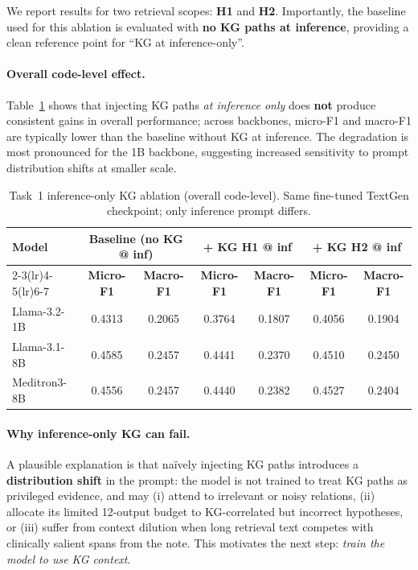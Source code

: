 We report results for two retrieval scopes: \textbf{H1} and \textbf{H2}. Importantly, the baseline used for this ablation is evaluated with \textbf{no KG paths at inference}, providing a clean reference point for ``KG at inference-only''.

\paragraph{Overall code-level effect.}
Table~\ref{tab:task1-kg-inference-overall} shows that injecting KG paths \emph{at inference only} does \textbf{not} produce consistent gains in overall performance; across backbones, micro-F1 and macro-F1 are typically lower than the baseline without KG at inference. The degradation is most pronounced for the 1B backbone, suggesting increased sensitivity to prompt distribution shifts at smaller scale.

\begin{table}[t]
\centering
\caption{Task~1 inference-only KG ablation (overall code-level). Same fine-tuned TextGen checkpoint; only inference prompt differs.}
\label{tab:task1-kg-inference-overall}
\begin{tabular}{lcccccc}
\toprule
\textbf{Model} &
\multicolumn{2}{c}{\textbf{Baseline (no KG @ inf)}} &
\multicolumn{2}{c}{\textbf{+ KG H1 @ inf}} &
\multicolumn{2}{c}{\textbf{+ KG H2 @ inf}} \\
\cmidrule(lr){2-3}\cmidrule(lr){4-5}\cmidrule(lr){6-7}
& \textbf{Micro-F1} & \textbf{Macro-F1}
& \textbf{Micro-F1} & \textbf{Macro-F1}
& \textbf{Micro-F1} & \textbf{Macro-F1} \\
\midrule
Llama-3.2-1B   & 0.4313 & 0.2065 & 0.3764 & 0.1807 & 0.4056 & 0.1904 \\
Llama-3.1-8B   & 0.4585 & 0.2457 & 0.4441 & 0.2370 & 0.4510 & 0.2450 \\
Meditron3-8B   & 0.4556 & 0.2457 & 0.4440 & 0.2382 & 0.4527 & 0.2404 \\
\bottomrule
\end{tabular}
\end{table}

\paragraph{Why inference-only KG can fail.}
A plausible explanation is that na\"ively injecting KG paths introduces a \textbf{distribution shift} in the prompt: the model is not trained to treat KG paths as privileged evidence, and may (i) attend to irrelevant or noisy relations, (ii) allocate its limited 12-output budget to KG-correlated but incorrect hypotheses, or (iii) suffer from context dilution when long retrieval text competes with clinically salient spans from the note. This motivates the next step: \emph{train the model to use KG context}.

